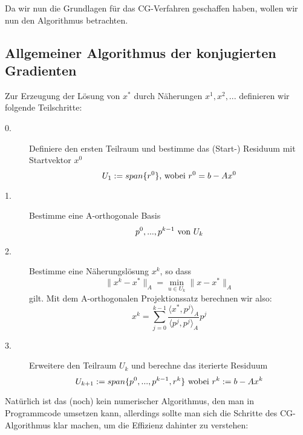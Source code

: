 Da wir nun die Grundlagen für das CG-Verfahren geschaffen haben, wollen wir nun den Algorithmus betrachten.

\subsection{Allgemeiner Algorithmus der konjugierten Gradienten}

Zur Erzeugung der Lösung von $x^{*}$ durch Näherungen $x^{1}, x^{2},...$ definieren wir folgende Teilschritte:

\begin{description}

\item[0.] Definiere den ersten Teilraum und bestimme das (Start-) Residuum mit Startvektor $x^{0}$
\begin{equation}
U_{1} := span\{r^{0}\} \textnormal{, wobei } r^{0} = b - Ax^{0}
\end{equation}

\item[1.] Bestimme eine A-orthogonale Basis
\begin{equation}
p^{0},...,p^{k-1} \textnormal{ von } U_{k}
\end{equation}

\item[2.] Bestimme eine Näherungslösung $x^{k}$, so dass
\begin{equation}
\|x^{k} - x^{*}\|_{A} = \underset{u \in U_{k}}{\min} \|x - x^{*}\|_{A}
\end{equation}
gilt. Mit dem A-orthogonalen Projektionssatz berechnen wir also:
\begin{equation}
x^{k} = \sum_{j=0}^{k-1} \frac {\langle x^{*}, p^{j} \rangle _{A}} {\langle p^{j}, p^{j} \rangle _{A}} p^{j}
\end{equation}

\item[3.] Erweitere den Teilraum $U_{k}$ und berechne das iterierte Residuum
\begin{equation}
U_{k+1} := span\{p^{0},...,p^{k-1},r^{k}\} \textnormal{ wobei } r^{k} := b - Ax^{k}
\end{equation}

\end{description}

Natürlich ist das (noch) kein numerischer Algorithmus, den man in Programmcode umsetzen kann, allerdings sollte man sich die Schritte des CG-Algorithmus klar machen, um die Effizienz dahinter zu verstehen:

